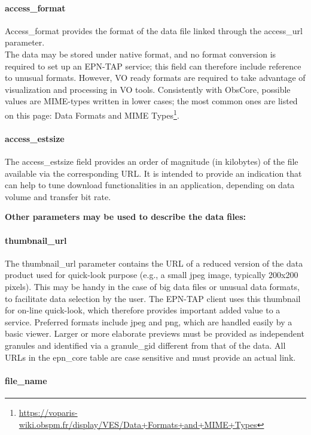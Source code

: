 \documentclass[11pt,a4paper]{ivoa}
\begin{document}
\paragraph{access\_format}

Access\_format provides the format of the data file linked through the access\_url parameter. \\The data may be stored under native format, and no format conversion is required to set up an EPN-TAP service; this field can therefore include reference to unusual formats. However, VO ready formats are required to take advantage of visualization and processing in VO tools. Consistently with ObsCore, possible values are MIME-types written in lower cases; the most common ones are listed on this page: Data Formats and MIME Types\footnote{\url{https://voparis-wiki.obspm.fr/display/VES/Data+Formats+and+MIME+Types}}.

\paragraph{access\_estsize}

The access\_estsize field provides an order of magnitude (in kilobytes) of the file available via the corresponding URL. It is intended to provide an indication that can help to tune download functionalities in an application, depending on data volume and transfer bit rate.


\textbf{Other parameters may be used to describe the data files:}

\paragraph{thumbnail\_url}

The thumbnail\_url parameter contains the URL of a reduced version of the data product used for quick-look purpose (e.g., a small jpeg image, typically 200x200 pixels). This may be handy in the case of big data files or unusual data formats, to facilitate data selection by the user. The EPN-TAP client uses this thumbnail for on-line quick-look, which therefore provides important added value to a service. Preferred formats include jpeg and png, which are handled easily by a basic viewer. Larger or more elaborate previews must be provided as independent granules and identified via a granule\_gid different from that of the data. All URLs in the epn\_core table are case sensitive and must provide an actual link.

\paragraph{file\_name}
\end{document}
